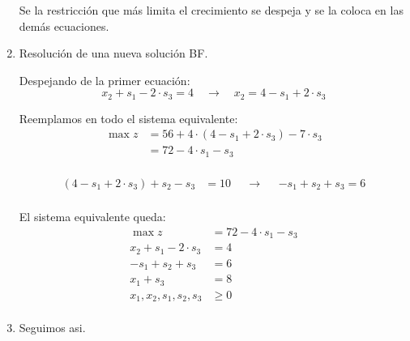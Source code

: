 \documentclass[../main.tex]{subfiles}
\begin{document}
\begin{example}
\begin{enumerate}
                    Se la restricción que más limita el crecimiento se despeja y se la coloca en las demás ecuaciones.
                \item Resolución de una nueva solución BF.
                
                    Despejando de la primer ecuación:
                    \begin{equation}
                        x_2 + s_1 -2 \cdot s_3 = 4 \quad \longrightarrow \quad x_2 = 4 - s_1 + 2 \cdot s_3
                    \end{equation}

                    Reemplamos en todo el sistema equivalente:
                    \begin{equation}
                        \begin{aligned}
                        \max z &= 56 + 4 \cdot (4 - s_1 + 2 \cdot s_3) - 7 \cdot s_3 \\
                               &= 72 - 4 \cdot s_1 - s_3 \\
                        \end{aligned}
                    \end{equation}

                    \begin{equation}
                        \begin{aligned}
                          (4 - s_1 + 2 \cdot s_3) + s_2 - s_3 &= 10 && \longrightarrow && -s_1 + s_2 + s_3 = 6 \\
                        \end{aligned}
                    \end{equation}


                    El sistema equivalente queda:
                    \begin{equation}
                        \begin{aligned}
                        \max z &= 72 - 4 \cdot s_1 - s_3 \\
                        x_2 + s_1 -2 \cdot s_3 &= 4 \\
                          -s_1 + s_2 + s_3 &= 6 \\
                          x_1 + s_3 &= 8 \\
                            x_1, x_2, s_1, s_2, s_3 &\geq 0 \\
                        \end{aligned}
                    \end{equation}
                \item Seguimos asi.
            \end{enumerate} 
        \end{example}
\end{document}
